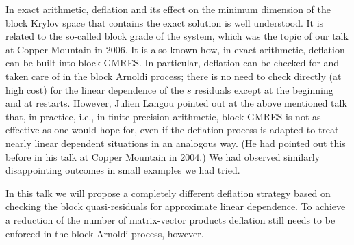 \documentclass{report}
\begin{document}
In exact arithmetic, deflation and its effect on the minimum dimension
of the block Krylov space that contains the exact solution is well
understood. It is related to the so-called block grade of the system,
which was the topic of our talk at Copper Mountain in 2006.
It is also known how, in exact arithmetic, deflation can be built
into block GMRES. In particular, deflation can be checked for and taken
care of in the block Arnoldi process; there is no need to check directly
(at high cost) for the linear dependence of the $s$ residuals except at the
beginning and at restarts. However, Julien Langou pointed out at the above
mentioned talk that, in practice, i.e., in finite precision arithmetic,
block GMRES is not as effective as one would hope for, even if the
deflation process is adapted to treat nearly linear dependent situations
in an analogous way.
(He had pointed out this before in his talk at Copper Mountain in 2004.)
We had observed similarly disappointing outcomes in small examples we
had tried.

In this talk we will propose a completely different deflation strategy
based on checking the block quasi-residuals for approximate linear
dependence. To achieve a reduction of the number of matrix-vector
products deflation still needs to be enforced in the block Arnoldi
process, however.
\end{document}
